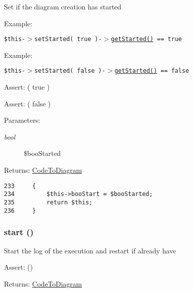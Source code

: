Set if the diagram creation has started

\begin{Desc}
\item[Example:]\end{Desc}
{\tt  \$this-$>$setStarted( true )-$>$\hyperlink{class_code_to_diagram_177cc628e31a482237aed841078a122f}{getStarted()} == true } \begin{Desc}
\item[Example:]\end{Desc}
{\tt  \$this-$>$setStarted( false )-$>$\hyperlink{class_code_to_diagram_177cc628e31a482237aed841078a122f}{getStarted()} == false } \begin{Desc}
\item[Assert:]( true ) \end{Desc}
\begin{Desc}
\item[Assert:]( false ) \end{Desc}
\begin{Desc}
\item[Parameters:]
\begin{description}
\item[{\em bool}]\$booStarted \end{description}
\end{Desc}
\begin{Desc}
\item[Returns:]\hyperlink{class_code_to_diagram}{CodeToDiagram} \end{Desc}


\begin{Code}\begin{verbatim}233     {
234         $this->booStart = $booStarted;
235         return $this;
236     }
\end{verbatim}
\end{Code}


\hypertarget{class_code_to_diagram_f8fa59992209e36dccb3eefb0f75531f}{
\subsubsection[{start}]{\setlength{\rightskip}{0pt plus 5cm}start ()}}
\label{class_code_to_diagram_f8fa59992209e36dccb3eefb0f75531f}


Start the log of the execution and restart if already have

\begin{Desc}
\item[Assert:]()\end{Desc}
\begin{Desc}
\item[Returns:]\hyperlink{class_code_to_diagram}{CodeToDiagram} \end{Desc}


